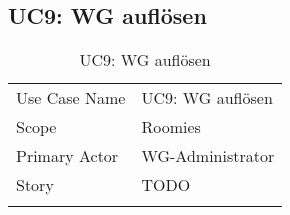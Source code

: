 \subsection{UC9: WG auflösen}
\begin{table}[H]
	\tablestyle
	\tablealtcolored
	\begin{tabularx}{\textwidth}{lX}
		\tablebody
			Use Case Name &
			UC9: WG auflösen
			\tabularnewline
			Scope &
			Roomies
			\tabularnewline
			Primary Actor &
			WG-Administrator
			\tabularnewline
			Story &
			TODO
			\tabularnewline
		\tableend
	\end{tabularx}
	\caption{UC9: WG auflösen}
\end{table}


